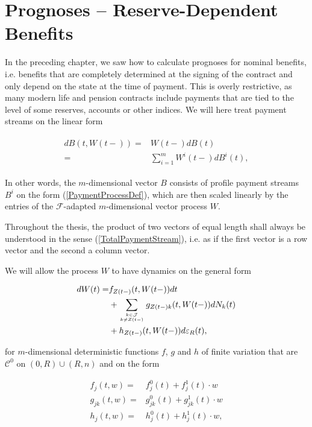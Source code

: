 \documentclass{article}
\newcommand{\1}[1]{\mathbbm{1}_{\left\lbrace #1 \right\rbrace}}
\theoremstyle{break}
\theoremstyle{remark}
\newenvironment{remark}
  {\pushQED{\qed}\renewcommand{\qedsymbol}{\scalebox{1.4}{$\circ$}}\remarkx}
  {\popQED\endremarkx}
\numberwithin{equation}{section}
\begin{document}
\newpage
\section{Prognoses -- Reserve-Dependent Benefits} \label{ChapReserveDepBen}

In the preceding chapter, we saw how to calculate prognoses for nominal benefits, i.e. benefits that are completely determined at the signing of the contract and only depend on the state at the time of payment. This is overly restrictive, as many modern life and pension contracts include payments that are tied to the level of some reserves, accounts or other indices. We will here treat payment streams on the linear form

\begin{align} \label{TotalPaymentStream}
\begin{split}
	dB(t,W(t-)) =& W(t-) dB(t) \\
=& \sum_{i=1}^{m} W^i(t-) dB^i(t),
\end{split}
\end{align}

In other words, the $m$-dimensional vector $B$ consists of profile payment streams $B^i$ on the form (\ref{PaymentProcessDef}), which are then scaled linearly by the entries of the $\mathcal{F}$-adapted $m$-dimensional vector process $W$.

\begin{remark}
	Throughout the thesis, the product of two vectors of equal length shall always be understood in the sense (\ref{TotalPaymentStream}), i.e. as if the first vector is a row vector and the second a column vector.
\end{remark}

We will allow the process $W$ to have dynamics on the general form

\begin{align} \label{WDynamicsStart}
	\begin{split}
		dW(t) =& f_{Z(t-)}(t,W(t-)) dt \\
		&+ \sum_{k \in \mathcal{J} \atop k \neq Z(t-)} g_{Z(t-)k}(t,W(t-)) dN_{k}(t) \\
		&+ h_{Z(t-)}(t,W(t-)) d \varepsilon_R(t),
	\end{split}
\end{align}

for $m$-dimensional deterministic functions $f$, $g$ and $h$ of finite variation that are $\mathcal{C}^0$ on $(0,R) \cup (R,n)$ and on the form

\begin{align*}
	f_j(t,w) =& f_j^0(t) + f_j^1(t) \cdot w \\
	g_{jk}(t,w) =& g_{jk}^0(t) + g_{jk}^1(t) \cdot w \\
	h_j(t,w) =& h_j^0(t) + h_j^1(t) \cdot w,
\end{align*}
\end{document}
